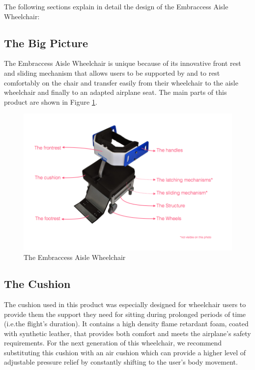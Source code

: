 The following sections explain in detail the design of the Embraccess Aisle Wheelchair:

\subsection{The Big Picture}

The Embraccess Aisle Wheelchair is unique because of its innovative front rest and sliding mechanism that allows users to be supported by and to rest comfortably on the chair and transfer easily from their wheelchair to the aisle wheelchair and finally to an adapted airplane seat. The main parts of this product are shown in Figure \ref{fig:wheelchair}. 

\begin{figure}[h]
\centering
\includegraphics[width=13cm]{images/AisleWheelchair1.png}
\caption{The Embraccess Aisle Wheelchair}
\label{fig:wheelchair}
\end{figure}


\subsection{The Cushion}

The cushion used in this product was especially designed for wheelchair users to provide them the support they need for sitting during prolonged periods of time (i.e.the  flight's duration). It contains a high density flame retardant foam, coated with synthetic leather, that provides both comfort and meets the airplane’s safety requirements. For the next generation of this wheelchair, we recommend substituting this cushion with an air cushion which can provide a higher level of adjustable pressure relief by constantly shifting to the user's body movement.

